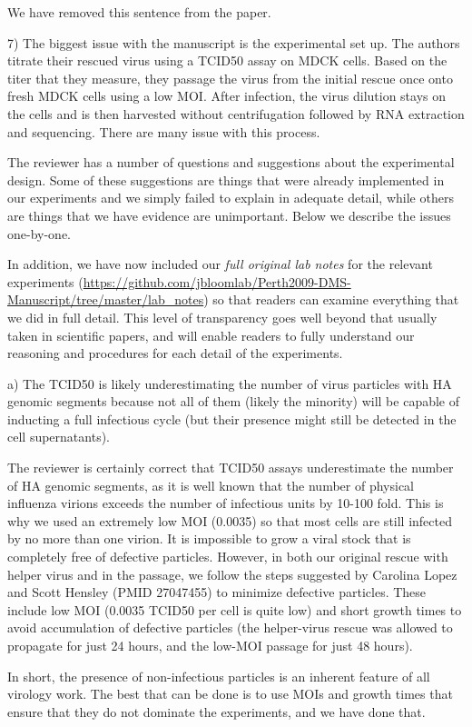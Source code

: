 \documentclass[11pt, oneside]{article}   	%
\newcommand{\response}[1]{{\color{black}#1}}
\begin{document}
\response{We have removed this sentence from the paper.}

7) The biggest issue with the manuscript is the experimental set up. The authors titrate their rescued virus using a TCID50 assay on MDCK cells. Based on the titer that they measure, they passage the virus from the initial rescue once onto fresh MDCK cells using a low MOI. After infection, the virus dilution stays on the cells and is then harvested without centrifugation followed by RNA extraction and sequencing. There are many issue with this process. 

\response{The reviewer has a number of questions and suggestions about the experimental design.
Some of these suggestions are things that were already implemented in our experiments and we simply failed to explain in adequate detail, while others are things that we have evidence are unimportant. 
Below we describe the issues one-by-one.

In addition, we have now included our \emph{full original lab notes} for the relevant experiments (\url{https://github.com/jbloomlab/Perth2009-DMS-Manuscript/tree/master/lab_notes}) so that readers can examine everything that we did in full detail.
This level of transparency goes well beyond that usually taken in scientific papers, and will enable readers to fully understand our reasoning and procedures for each detail of the experiments.
}

a) The TCID50 is likely underestimating the number of virus particles with HA genomic segments because not all of them (likely the minority) will be capable of inducting a full infectious cycle (but their presence might still be detected in the cell supernatants). 

\response{The reviewer is certainly correct that TCID50 assays underestimate the number of HA genomic segments, as it is well known that the number of physical influenza virions exceeds the number of infectious units by 10-100 fold.
This is why we used an extremely low MOI (0.0035) so that most cells are still infected by no more than one virion.
It is impossible to grow a viral stock that is completely free of defective particles.
However, in both our original rescue with helper virus and in the passage, we follow the steps suggested by Carolina Lopez and Scott Hensley (PMID 27047455) to minimize defective particles.
These include low MOI (0.0035 TCID50 per cell is quite low) and short growth times to avoid accumulation of defective particles (the helper-virus rescue was allowed to propagate for just 24 hours, and the low-MOI passage for just 48 hours).

In short, the presence of non-infectious particles is an inherent feature of all virology work.
The best that can be done is to use MOIs and growth times that ensure that they do not dominate the experiments, and we have done that.
}
\end{document}
